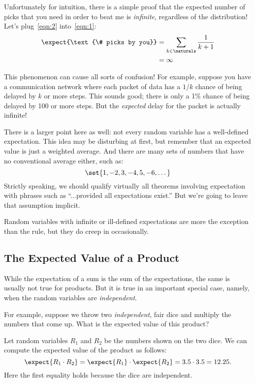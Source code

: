 Unfortunately for intuition, there is a simple proof that the expected
number of picks that you need in order to beat me is
\textit{infinite}, regardless of the distribution!  Let's
plug~\eqref{eqn:2} into~\eqref{eqn:1}:
%
\begin{align*}
\expect{\text{\# picks by you}}
    & = \sum_{k \in \naturals} \frac{1}{k+1} \\
    & = \infty
\end{align*}

This phenomenon can cause all sorts of confusion!  For example,
suppose you have a communication network where each packet of data has
a $1/k$ chance of being delayed by $k$ or more steps.  This sounds
good; there is only a 1\% chance of being delayed by 100 or more
steps.  But the \textit{expected} delay for the packet is actually
infinite!

There is a larger point here as well: not every random variable has a
well-defined expectation.  This idea may be disturbing at first, but
remember that an expected value is just a weighted average.  And there
are many sets of numbers that have no conventional average either, such as:
%
\[
\set{1, -2, 3, -4, 5, -6, \dots}
\]
%
Strictly speaking, we should qualify virtually all theorems involving
expectation with phrases such as ``...provided all expectations exist.''
But we're going to leave that assumption implicit.

Random variables with infinite or ill-defined expectations are more the
exception than the rule, but they do creep in occasionally.

\fi

\subsection{The Expected Value of a Product}

While the expectation of a sum is the sum of the expectations, the same is
usually not true for products.  But it is true in an important special
case, namely, when the random variables are \emph{independent}.

For example, suppose we throw two \emph{independent}, fair dice and
multiply the numbers that come up.  What is the expected value of this
product?

Let random variables $R_1$ and $R_2$ be the numbers shown on the two
dice.  We can compute the expected value of the product as follows:
\begin{equation}\label{R1R2}
  \expect{R_1 \cdot R_2}
  = \expect{R_1} \cdot \expect{R_2}
  = 3.5 \cdot 3.5
  = 12.25.
\end{equation}
Here the first equality holds because the dice are independent.

